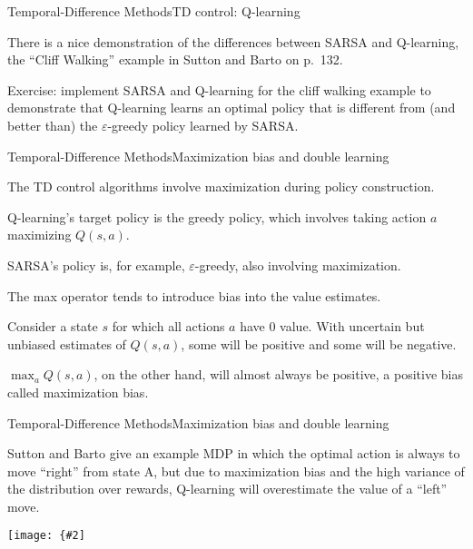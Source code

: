 \documentclass{beamer}
\newcommand{\myfig}[3]{\centerline{\texttt{[image: \{\#2]}}}
    \centerline{\scriptsize #3}}
\begin{document}
\begin{frame}{Temporal-Difference Methods}{TD control: Q-learning}

  There is a nice demonstration of the differences between SARSA and
  Q-learning, the ``Cliff Walking'' example in Sutton and Barto on
  p.\ 132.

  \medskip

  \alert{Exercise}: implement SARSA and Q-learning for the cliff walking
  example to demonstrate that Q-learning learns an optimal policy that is
  different from (and better than) the $\varepsilon$-greedy policy learned
  by SARSA.
  
\end{frame}


\begin{frame}{Temporal-Difference Methods}{Maximization bias and double learning}

  The TD control algorithms involve \alert{maximization} during policy
  construction.

  \medskip

  Q-learning's target policy is the greedy policy, which involves
  taking action $a$ maximizing $Q(s,a)$.

  \medskip

  SARSA's policy is, for example, $\varepsilon$-greedy, also involving
  maximization.

  \medskip

  The max operator tends to introduce \alert{bias} into the value estimates.

  \medskip

  Consider a state $s$ for which all actions $a$ have 0 value. With
  uncertain but unbiased estimates of $Q(s,a)$, some will be positive
  and some will be negative.

  \medskip

  $\max_a Q(s,a)$, on the other hand, will almost always be positive,
  a positive bias called \alert{maximization bias}.

\end{frame}


\begin{frame}{Temporal-Difference Methods}{Maximization bias and double learning
  }

  Sutton and Barto give an example MDP in which the optimal
  action is always to move ``right'' from state A, but due to maximization
  bias and the high variance of the distribution over rewards,
  Q-learning will overestimate the value of a ``left'' move.

  \bigskip
  
  \myfig{3in}{sutton-fig6-5}{Sutton and Barto (2018), Fig.\ 6.5}
  
\end{frame}
\end{document}

